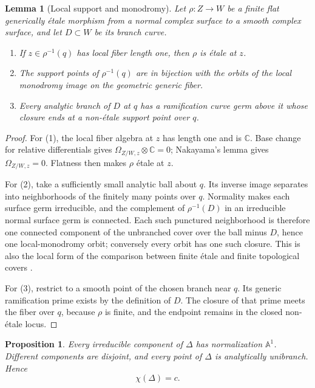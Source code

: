 \documentclass[11pt]{article}
\newtheorem{proposition}[theorem]{Proposition}
\newtheorem{lemma}[theorem]{Lemma}
\theoremstyle{definition}
\theoremstyle{remark}
\newcommand{\A}{\mathbb A}
\newcommand{\C}{\mathbb C}
\begin{document}
\begin{lemma}[Local support and monodromy]\label{lem:local-cover}
Let \(\rho:Z\to W\) be a finite flat generically \'etale morphism
from a normal complex surface to a smooth complex surface, and let
\(D\subset W\) be its branch curve.
\begin{enumerate}
\item If \(z\in\rho^{-1}(q)\) has local fiber length one, then
  \(\rho\) is \'etale at \(z\).
\item The support points of \(\rho^{-1}(q)\) are in bijection with the
  orbits of the local monodromy image on the geometric generic fiber.
\item Every analytic branch of \(D\) at \(q\) has a ramification curve
  germ above it whose closure ends at a non-\'etale support point over
  \(q\).
\end{enumerate}
\end{lemma}

\begin{proof}
For (1), the local fiber algebra at \(z\) has length one and is
\(\C\).  Base change for relative differentials gives
\(\Omega_{Z/W,z}\otimes\C=0\); Nakayama's lemma gives
\(\Omega_{Z/W,z}=0\).  Flatness then makes \(\rho\) \'etale at \(z\).

For (2), take a sufficiently small analytic ball about \(q\).
Its inverse image separates into neighborhoods of the finitely many
points over \(q\).  Normality makes each surface germ irreducible, and
the complement of \(\rho^{-1}(D)\) in an irreducible normal surface
germ is connected.  Each such punctured neighborhood is therefore one
connected component of the unbranched cover over the ball minus
\(D\), hence one local-monodromy orbit; conversely every orbit has one
such closure.  This is also the local form of the comparison between
finite \'etale and finite topological covers
\cite[Expos\'e XII]{SGA1}.

For (3), restrict to a smooth point of the chosen branch near \(q\).
Its generic ramification prime exists by the definition of \(D\).
The closure of that prime meets the fiber over \(q\), because \(\rho\)
is finite, and the endpoint remains in the closed non-\'etale locus.
\end{proof}

\begin{proposition}\label{prop:branch-topology}
Every irreducible component of \(\Delta\) has normalization \(\A^1\).
Different components are disjoint, and every point of \(\Delta\) is
analytically unibranch.  Hence
\[
 \chi(\Delta)=c.
 \tag{3.4}
\]
\end{proposition}
\end{document}
